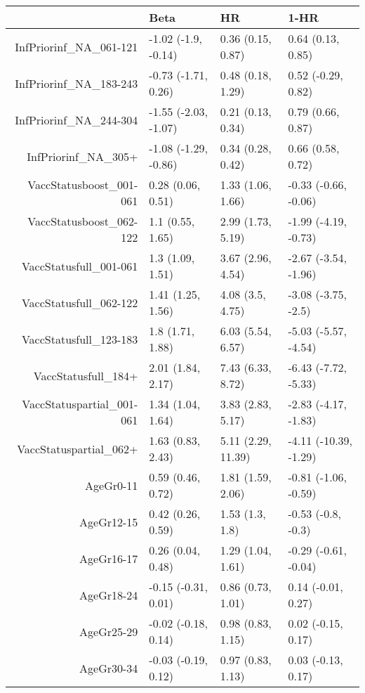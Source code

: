 \begin{table}[ht]
\centering
\begin{tabular}{rlll}
  \hline
 & Beta & HR & 1-HR \\ 
  \hline
InfPriorinf\_NA\_061-121 & -1.02 (-1.9, -0.14) & 0.36 (0.15, 0.87) & 0.64 (0.13, 0.85) \\ 
  InfPriorinf\_NA\_183-243 & -0.73 (-1.71, 0.26) & 0.48 (0.18, 1.29) & 0.52 (-0.29, 0.82) \\ 
  InfPriorinf\_NA\_244-304 & -1.55 (-2.03, -1.07) & 0.21 (0.13, 0.34) & 0.79 (0.66, 0.87) \\ 
  InfPriorinf\_NA\_305+ & -1.08 (-1.29, -0.86) & 0.34 (0.28, 0.42) & 0.66 (0.58, 0.72) \\ 
  VaccStatusboost\_001-061 & 0.28 (0.06, 0.51) & 1.33 (1.06, 1.66) & -0.33 (-0.66, -0.06) \\ 
  VaccStatusboost\_062-122 & 1.1 (0.55, 1.65) & 2.99 (1.73, 5.19) & -1.99 (-4.19, -0.73) \\ 
  VaccStatusfull\_001-061 & 1.3 (1.09, 1.51) & 3.67 (2.96, 4.54) & -2.67 (-3.54, -1.96) \\ 
  VaccStatusfull\_062-122 & 1.41 (1.25, 1.56) & 4.08 (3.5, 4.75) & -3.08 (-3.75, -2.5) \\ 
  VaccStatusfull\_123-183 & 1.8 (1.71, 1.88) & 6.03 (5.54, 6.57) & -5.03 (-5.57, -4.54) \\ 
  VaccStatusfull\_184+ & 2.01 (1.84, 2.17) & 7.43 (6.33, 8.72) & -6.43 (-7.72, -5.33) \\ 
  VaccStatuspartial\_001-061 & 1.34 (1.04, 1.64) & 3.83 (2.83, 5.17) & -2.83 (-4.17, -1.83) \\ 
  VaccStatuspartial\_062+ & 1.63 (0.83, 2.43) & 5.11 (2.29, 11.39) & -4.11 (-10.39, -1.29) \\ 
  AgeGr0-11 & 0.59 (0.46, 0.72) & 1.81 (1.59, 2.06) & -0.81 (-1.06, -0.59) \\ 
  AgeGr12-15 & 0.42 (0.26, 0.59) & 1.53 (1.3, 1.8) & -0.53 (-0.8, -0.3) \\ 
  AgeGr16-17 & 0.26 (0.04, 0.48) & 1.29 (1.04, 1.61) & -0.29 (-0.61, -0.04) \\ 
  AgeGr18-24 & -0.15 (-0.31, 0.01) & 0.86 (0.73, 1.01) & 0.14 (-0.01, 0.27) \\ 
  AgeGr25-29 & -0.02 (-0.18, 0.14) & 0.98 (0.83, 1.15) & 0.02 (-0.15, 0.17) \\ 
  AgeGr30-34 & -0.03 (-0.19, 0.12) & 0.97 (0.83, 1.13) & 0.03 (-0.13, 0.17) \\ 

\end{tabular}
\end{table}
